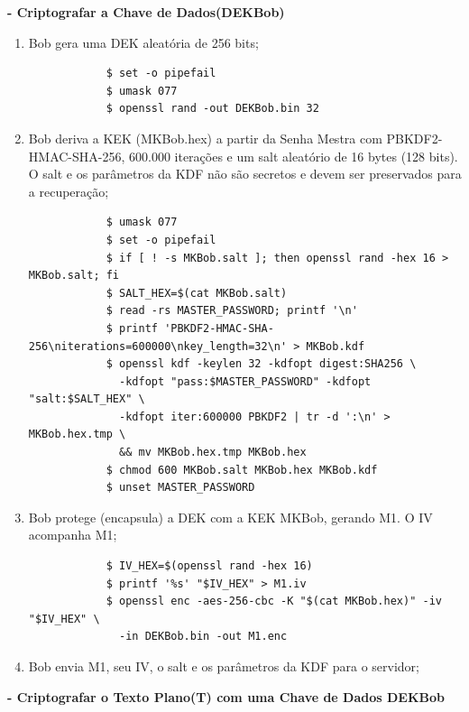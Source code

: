 \documentclass{article}
\begin{document}
\textbf{- Criptografar a Chave de Dados(DEKBob)}

\begin{enumerate}
	\item Bob gera uma DEK aleatória de 256 bits;
	\begin{tcolorbox}[width=\textwidth]
		{\normalsize
			\begin{verbatim}
			$ set -o pipefail
			$ umask 077
			$ openssl rand -out DEKBob.bin 32
			\end{verbatim}
		}
	\end{tcolorbox}
	\item Bob deriva a KEK (MKBob.hex) a partir da Senha Mestra com PBKDF2-HMAC-SHA-256, 600.000 iterações e um salt aleatório de 16 bytes (128 bits). O salt e os parâmetros da KDF não são secretos e devem ser preservados para a recuperação;
	\begin{tcolorbox}[width=\textwidth]
		{\footnotesize
			\begin{verbatim}
			$ umask 077
			$ set -o pipefail
			$ if [ ! -s MKBob.salt ]; then openssl rand -hex 16 > MKBob.salt; fi
			$ SALT_HEX=$(cat MKBob.salt)
			$ read -rs MASTER_PASSWORD; printf '\n'
			$ printf 'PBKDF2-HMAC-SHA-256\niterations=600000\nkey_length=32\n' > MKBob.kdf
			$ openssl kdf -keylen 32 -kdfopt digest:SHA256 \
			  -kdfopt "pass:$MASTER_PASSWORD" -kdfopt "salt:$SALT_HEX" \
			  -kdfopt iter:600000 PBKDF2 | tr -d ':\n' > MKBob.hex.tmp \
			  && mv MKBob.hex.tmp MKBob.hex
			$ chmod 600 MKBob.salt MKBob.hex MKBob.kdf
			$ unset MASTER_PASSWORD
			\end{verbatim}
		}
	\end{tcolorbox}
	\item Bob protege (encapsula) a DEK com a KEK MKBob, gerando M1. O IV acompanha M1;
	\begin{tcolorbox}[width=\textwidth]
		{\scriptsize
			\begin{verbatim}
			$ IV_HEX=$(openssl rand -hex 16)
			$ printf '%s' "$IV_HEX" > M1.iv
			$ openssl enc -aes-256-cbc -K "$(cat MKBob.hex)" -iv "$IV_HEX" \
			  -in DEKBob.bin -out M1.enc
			\end{verbatim}
		}
	\end{tcolorbox}
	\item Bob envia M1, seu IV, o salt e os parâmetros da KDF para o servidor;
\end{enumerate}

\textbf{- Criptografar o Texto Plano(T) com uma Chave de Dados DEKBob}
\end{document}
